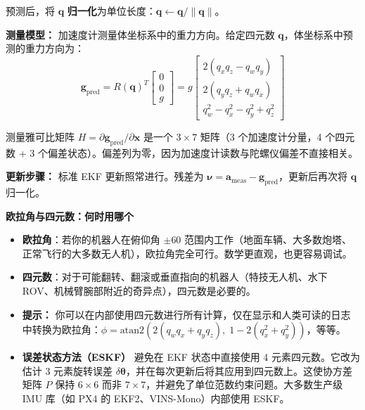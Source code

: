 预测后，将 $\mathbf{q}$ \textbf{归一化}为单位长度：$\mathbf{q} \leftarrow \mathbf{q}/\|\mathbf{q}\|$。

\textbf{测量模型：} 加速度计测量体坐标系中的重力方向。给定四元数 $\mathbf{q}$，体坐标系中预测的重力方向为：
\begin{equation}
\mathbf{g}_{\text{pred}} = R(\mathbf{q})^T \begin{bmatrix} 0 \\ 0 \\ g \end{bmatrix}
= g\begin{bmatrix}
2(q_x q_z - q_w q_y) \\
2(q_y q_z + q_w q_x) \\
q_w^2 - q_x^2 - q_y^2 + q_z^2
\end{bmatrix}
\end{equation}

测量雅可比矩阵 $H = \partial \mathbf{g}_{\text{pred}} / \partial \mathbf{x}$ 是一个 $3\times 7$ 矩阵（3 个加速度计分量，4 个四元数 + 3 个偏差状态）。偏差列为零，因为加速度计读数与陀螺仪偏差不直接相关。

\textbf{更新步骤：} 标准 EKF 更新照常进行。残差为 $\boldsymbol{\nu} = \mathbf{a}_{\text{meas}} - \mathbf{g}_{\text{pred}}$，更新后再次将 $\mathbf{q}$ 归一化。

\begin{mdframed}[linewidth=1pt, innertopmargin=10pt, innerbottommargin=10pt]
\textbf{欧拉角与四元数：何时用哪个}

\vspace{0.3em}
\begin{itemize}[nosep]
    \item \textbf{欧拉角}：若你的机器人在俯仰角 $\pm 60$\textdegree{} 范围内工作（地面车辆、大多数炮塔、正常飞行的大多数无人机），欧拉角完全可行。数学更直观，也更容易调试。
    \item \textbf{四元数}：对于可能翻转、翻滚或垂直指向的机器人（特技无人机、水下 ROV、机械臂腕部附近的奇异点），四元数是必要的。
    \item \textbf{提示：} 你可以在内部使用四元数进行所有计算，仅在显示和人类可读的日志中转换为欧拉角：$\phi = \text{atan2}(2(q_w q_x + q_y q_z),\; 1 - 2(q_x^2 + q_y^2))$，等等。
    \item \textbf{误差状态方法（ESKF）} 避免在 EKF 状态中直接使用 4 元素四元数。它改为估计 3 元素旋转误差 $\delta\boldsymbol{\theta}$，并在每次更新后将其应用到四元数上。这使协方差矩阵 $P$ 保持 $6\times 6$ 而非 $7\times 7$，并避免了单位范数约束问题。大多数生产级 IMU 库（如 PX4 的 EKF2、VINS-Mono）内部使用 ESKF。
\end{itemize}
\end{mdframed}

